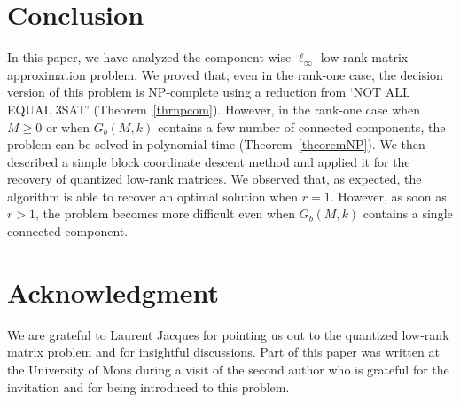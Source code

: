 \documentclass[a4paper,11pt]{article}
\numberwithin{equation}{section}
\begin{document}
\section{Conclusion} 

In this paper, we have analyzed the component-wise $\ell_{\infty}$ low-rank matrix approximation problem. We proved that, even in the rank-one case, the decision version of this problem is NP-complete using a reduction from `NOT ALL EQUAL 3SAT' (Theorem~\ref{thrnpcom}).  
However, in the rank-one case when $M \geq 0$ or when $G_b(M,k)$ contains a few number of connected components, 
the problem can be solved in polynomial time (Theorem~\ref{theoremNP}). 
We then described a simple block coordinate descent method and applied it for the recovery of quantized low-rank matrices. 
We observed that, as expected, the algorithm is able to recover an optimal solution when $r=1$. 
However, as soon as $r > 1$, the problem becomes more difficult even when $G_b(M,k)$ contains a single connected component. 



\section*{Acknowledgment} 

We are grateful to Laurent Jacques for pointing us out to the quantized low-rank matrix problem and for insightful discussions. Part of this paper was written at the University of Mons during a visit of the second author who is grateful for the invitation and for being introduced to this problem. 

 

\small



\end{document}
